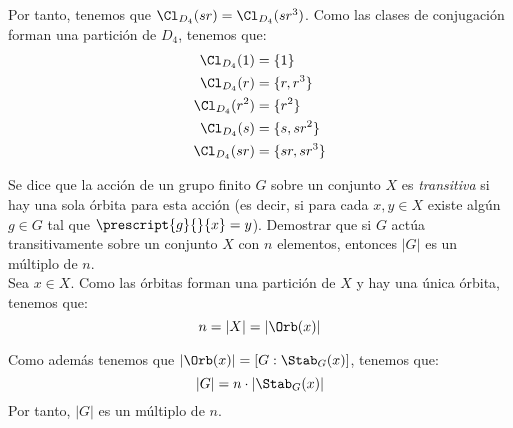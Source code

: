 \begin{ejercicio}
    Por tanto, tenemos que $\Cl_{D_4}(sr) = \Cl_{D_4}(sr^3)$. Como las clases de conjugación forman una partición de $D_4$, tenemos que:
    \begin{align*}
        \Cl_{D_4}(1) &= \{1\} \\
        \Cl_{D_4}(r) &= \{r, r^3\} \\
        \Cl_{D_4}(r^2) &= \{r^2\} \\
        \Cl_{D_4}(s) &= \{s, sr^2\} \\
        \Cl_{D_4}(sr) &= \{sr, sr^3\}
    \end{align*}
\end{ejercicio}

\begin{ejercicio}\label{ej:6.7}
    Se dice que la acción de un grupo finito $G$ sobre un conjunto $X$ es \emph{transitiva} si hay una sola órbita para esta acción (es decir, si para cada $x, y \in X$ existe algún $g \in G$ tal que $\prescript{g}{}{x} = y$). Demostrar que si $G$ actúa transitivamente sobre un conjunto $X$ con $n$ elementos, entonces $|G|$ es un múltiplo de $n$.\\

    Sea $x\in X$. Como las órbitas forman una partición de $X$ y hay una única órbita, tenemos que:
    \begin{equation*}
        n = |X| = |\Orb(x)|
    \end{equation*}

    Como además tenemos que $|\Orb(x)|=[G:\Stab_G(x)]$, tenemos que:
    \begin{equation*}
        |G| = n\cdot |\Stab_G(x)|
    \end{equation*}
    Por tanto, $|G|$ es un múltiplo de $n$.
\end{ejercicio}

